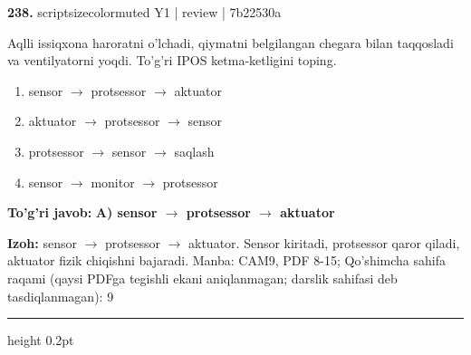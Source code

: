 \documentclass[10pt,a4paper]{article}
\begin{document}
{\bfseries\sffamily\color{ink} 238.} {scriptsizecolor{muted} Y1 | review | 7b22530a}
\par
Aqlli issiqxona haroratni o'lchadi, qiymatni belgilangan chegara bilan taqqosladi va ventilyatorni yoqdi. To'g'ri IPOS ketma-ketligini toping.
\begin{enumerate}[label=\Alph*),leftmargin=9mm]
\item sensor \ensuremath{\rightarrow} protsessor \ensuremath{\rightarrow} aktuator
\item aktuator \ensuremath{\rightarrow} protsessor \ensuremath{\rightarrow} sensor
\item protsessor \ensuremath{\rightarrow} sensor \ensuremath{\rightarrow} saqlash
\item sensor \ensuremath{\rightarrow} monitor \ensuremath{\rightarrow} protsessor
\end{enumerate}
\begin{tcolorbox}[enhanced,breakable,colback=teal!4,colframe=teal!60!black,boxrule=0.45pt,arc=1.2mm,left=2.7mm,right=2.7mm,top=1.8mm,bottom=1.8mm,before skip=2mm,after skip=2mm]
{\bfseries\sffamily\color{teal}To'g'ri javob:} \textbf{A) sensor \ensuremath{\rightarrow} protsessor \ensuremath{\rightarrow} aktuator}
\par\smallskip
{\bfseries Izoh:} sensor \ensuremath{\rightarrow} protsessor \ensuremath{\rightarrow} aktuator. Sensor kiritadi, protsessor qaror qiladi, aktuator fizik chiqishni bajaradi. Manba: CAM9, PDF 8-15; Qo'shimcha sahifa raqami (qaysi PDFga tegishli ekani aniqlanmagan; darslik sahifasi deb tasdiqlanmagan): 9
\end{tcolorbox}
\vspace{2mm}\hrule height 0.2pt\vspace{3mm}
\end{document}
